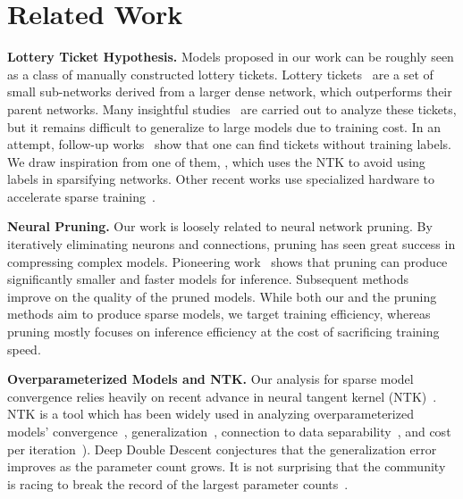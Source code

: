 \section{Related Work}
\textbf{Lottery Ticket Hypothesis.} Models proposed in our work can be roughly seen as a class of manually constructed lottery tickets. Lottery tickets~\citep{frankle2018lottery} are a set of small sub-networks derived from a larger dense network, which outperforms their parent networks. Many insightful studies~\citep{morcos2019one, orseau2020logarithmic, frankle2019stabilizing, frankle2020linear, malach2020proving, pensia2020optimal} are carried out to analyze these tickets, but it remains difficult to generalize to large models due to training cost. In an attempt, follow-up works~\citep{wang2020picking, tanaka2020pruning} show that one can find tickets without training labels. We draw inspiration from one of them, \citet{liu2020finding}, which uses the NTK to avoid using labels in sparsifying networks. Other recent works use specialized hardware to accelerate sparse training~\citep{Goli_2020_CVPR, raihan2020sparse}.

\textbf{Neural Pruning.} Our work is loosely related to neural network pruning. By iteratively eliminating neurons and connections, pruning has seen great success in compressing complex models. Pioneering work~\citep{han2015deep,han2015learning} shows that pruning can produce significantly smaller and faster models for inference. Subsequent methods~\citep{li2016pruning, NIPS2017_a51fb975, dong2017learning,  sanh2020movement, lagunas2021block, zhu2017prune} improve on the quality of the pruned models. While both our and the pruning methods aim to produce sparse models, we target training efficiency, whereas pruning mostly focuses on inference efficiency at the cost of sacrificing training speed.

\textbf{Overparameterized Models and NTK.} Our analysis for sparse model convergence relies heavily on recent advance in neural tangent kernel (NTK)~\citep{jacot2018neural}. NTK is a tool which has been widely used in analyzing overparameterized models' convergence~\citep{ll18,dzps19,als19_dnn,als19_rnn,sy19}, generalization~\citep{all19}, connection to data separability~\citep{os20}, and cost per iteration~\citep{bpsw21}). Deep Double Descent \citep{nakkiran2019deep, d2020triple} conjectures that the generalization error improves as the parameter count grows. It is not surprising that the community is racing to break the record of the largest parameter counts~\citep{radford2019language, brown2020language, dosovitskiy2020image, tolstikhin2021mlp, zhang2021cpm, naumov2019deep, jumper2021highly}. 

